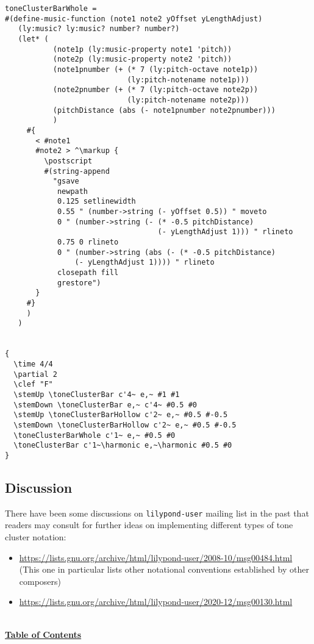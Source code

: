 \begin{verbatim}
toneClusterBarWhole =
#(define-music-function (note1 note2 yOffset yLengthAdjust)
   (ly:music? ly:music? number? number?)
   (let* (
           (note1p (ly:music-property note1 'pitch))
           (note2p (ly:music-property note2 'pitch))
           (note1pnumber (+ (* 7 (ly:pitch-octave note1p))
                            (ly:pitch-notename note1p)))
           (note2pnumber (+ (* 7 (ly:pitch-octave note2p))
                            (ly:pitch-notename note2p)))
           (pitchDistance (abs (- note1pnumber note2pnumber)))
           )
     #{
       < #note1
       #note2 > ^\markup {
         \postscript
         #(string-append
           "gsave
            newpath
            0.125 setlinewidth
            0.55 " (number->string (- yOffset 0.5)) " moveto
            0 " (number->string (- (* -0.5 pitchDistance)
                                   (- yLengthAdjust 1))) " rlineto
            0.75 0 rlineto
            0 " (number->string (abs (- (* -0.5 pitchDistance)
                (- yLengthAdjust 1)))) " rlineto
            closepath fill
            grestore")
       }
     #}
     )
   )


{
  \time 4/4
  \partial 2
  \clef "F"
  \stemUp \toneClusterBar c'4~ e,~ #1 #1
  \stemDown \toneClusterBar e,~ c'4~ #0.5 #0
  \stemUp \toneClusterBarHollow c'2~ e,~ #0.5 #-0.5
  \stemDown \toneClusterBarHollow c'2~ e,~ #0.5 #-0.5
  \toneClusterBarWhole c'1~ e,~ #0.5 #0
  \toneClusterBar c'1~\harmonic e,~\harmonic #0.5 #0
}
\end{verbatim}
\subsection{Discussion}
There have been some discussions on \verb|lilypond-user| mailing list in the past that readers may consult for further ideas on implementing different types of tone cluster notation: 
\begin{itemize}
\item \url{https://lists.gnu.org/archive/html/lilypond-user/2008-10/msg00484.html} (This one in particular lists other notational conventions established by other composers)
\item \url{https://lists.gnu.org/archive/html/lilypond-user/2020-12/msg00130.html}

\end{itemize}
\hyperref[sec:toc]{\\ \textbf{Table of Contents}}

\clearpage



